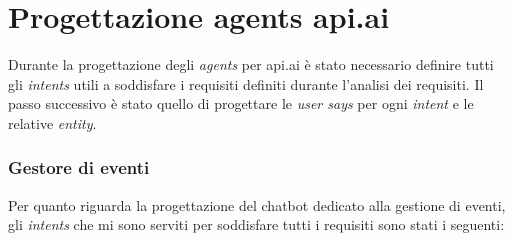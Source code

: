 \section{Progettazione agents api.ai}
Durante la progettazione degli \emph{agents} per api.ai è stato necessario definire tutti gli \emph{intents} utili a soddisfare i requisiti definiti durante l'analisi dei requisiti. Il passo successivo è stato quello di progettare le \emph{user says} per ogni \emph{intent} e le relative \emph{entity}.

\subsubsection{Gestore di eventi}
Per quanto riguarda la progettazione del \gls{chatbot} dedicato alla gestione di eventi, gli \emph{intents} che mi sono serviti per soddisfare tutti i requisiti sono stati i seguenti:

